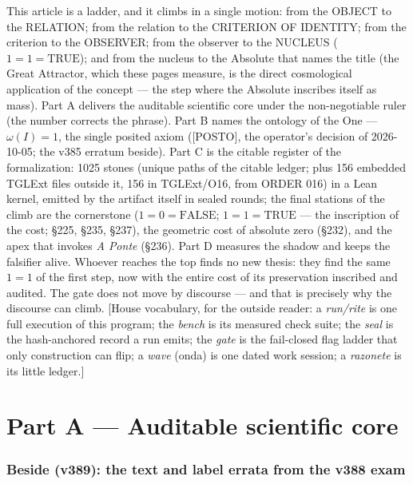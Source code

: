 \documentclass[11pt]{article}
\theoremstyle{definition}\newtheorem{deriv}{Derivation}
\begin{document}
\noindent This article is a ladder, and it climbs in a single motion: from the OBJECT to the RELATION; from the relation to the CRITERION OF IDENTITY; from the criterion to the OBSERVER; from the observer to the NUCLEUS ($1{=}1{=}\mathrm{TRUE}$); and from the nucleus to the Absolute that names the title (the Great Attractor, which these pages measure, is the direct cosmological application of the concept --- the step where the Absolute inscribes itself as mass). Part A delivers the auditable scientific core under the non-negotiable ruler (the number corrects the phrase). Part B names the ontology of the One --- $\omega(I){=}1$, the single posited axiom (\textsf{[POSTO]}, the operator's decision of 2026-10-05; the v385 erratum beside). Part C is the citable register of the formalization: 1025 stones (unique paths of the citable ledger; plus 156 embedded TGLExt files outside it, 156 in TGLExt/O16, from ORDER 016) in a Lean kernel, emitted by the artifact itself in sealed rounds; the final stations of the climb are the cornerstone ($1{=}0{=}\mathrm{FALSE}$; $1{=}1{=}\mathrm{TRUE}$ --- the inscription of the cost; \S225, \S235, \S237), the geometric cost of absolute zero (\S232), and the apex that invokes \emph{A Ponte} (\S236). Part D measures the shadow and keeps the falsifier alive. Whoever reaches the top finds no new thesis: they find the same $1{=}1$ of the first step, now with the entire cost of its preservation inscribed and audited. The gate does not move by discourse --- and that is precisely why the discourse can climb. [House vocabulary, for the outside reader: a \emph{run/rite} is one full execution of this program; the \emph{bench} is its measured check suite; the \emph{seal} is the hash-anchored record a run emits; the \emph{gate} is the fail-closed flag ladder that only construction can flip; a \emph{wave} (onda) is one dated work session; a \emph{razonete} is its little ledger.]

\part{Part A --- Auditable scientific core}

\section*{Beside (v389): the text and label errata from the v388 exam}

\end{document}
